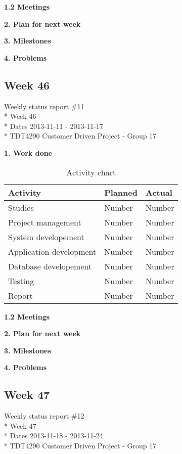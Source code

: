 \textbf{1.2 Meetings}

\textbf{2. Plan for next week}

\textbf{3. Milestones}

\textbf{4. Problems}

\newpage
\subsection{Week 46}

\begin{center}
Weekly status report \#11\\*
Week 46 \\*
Dates 2013-11-11 - 2013-11-17 \\*
TDT4290 Customer Driven Project - Group 17
\end{center}

\textbf{1. Work done}

\begin{table}[H]
\begin{center}
\begin{tabular}{ l | l | l }
  \hline
  Activity & Planned & Actual \\
  \hline\noalign{\smallskip}\noalign{\smallskip}\hline
  Studies & Number & Number \\
  Project management & Number & Number \\
  System developement & Number & Number \\
  Application development & Number & Number \\
  Database developement & Number & Number \\
  Testing & Number & Number \\
  Report & Number & Number \\
  \hline
\end{tabular}
\end{center}
\caption{Activity chart}
\label{table:activityChartStatusReport}
\end{table}

\textbf{1.2 Meetings}

\textbf{2. Plan for next week}

\textbf{3. Milestones}

\textbf{4. Problems}

\newpage
\subsection{Week 47}

\begin{center}
Weekly status report \#12\\*
Week 47 \\*
Dates 2013-11-18 - 2013-11-24 \\*
TDT4290 Customer Driven Project - Group 17
\end{center}

